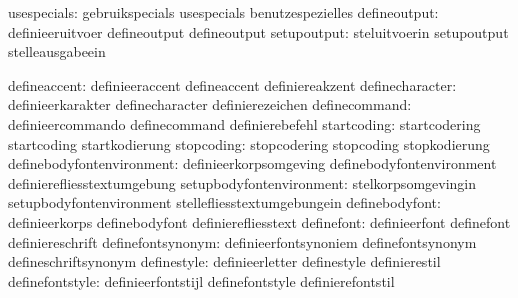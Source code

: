                   usespecials:  gebruikspecials              usespecials
                                benutzespezielles
                 defineoutput:  definieeruitvoer             defineoutput
                                defineoutput
                  setupoutput:  steluitvoerin                setupoutput
                                stelleausgabeein

                 defineaccent:  definieeraccent              defineaccent
                                definiereakzent
              definecharacter:  definieerkarakter            definecharacter
                                definierezeichen
                definecommand:  definieercommando            definecommand
                                definierebefehl
                  startcoding:  startcodering                startcoding
                                startkodierung
                   stopcoding:  stopcodering                 stopcoding
                                stopkodierung
    definebodyfontenvironment:  definieerkorpsomgeving       definebodyfontenvironment
                                definierefliesstextumgebung
     setupbodyfontenvironment:  stelkorpsomgevingin          setupbodyfontenvironment
                                stellefliesstextumgebungein
               definebodyfont:  definieerkorps               definebodyfont
                                definierefliesstext
                   definefont:  definieerfont                definefont
                                definiereschrift
            definefontsynonym:  definieerfontsynoniem        definefontsynonym
                                defineschriftsynonym
                  definestyle:  definieerletter              definestyle
                                definierestil
              definefontstyle:  definieerfontstijl           definefontstyle
                                definierefontstil %

